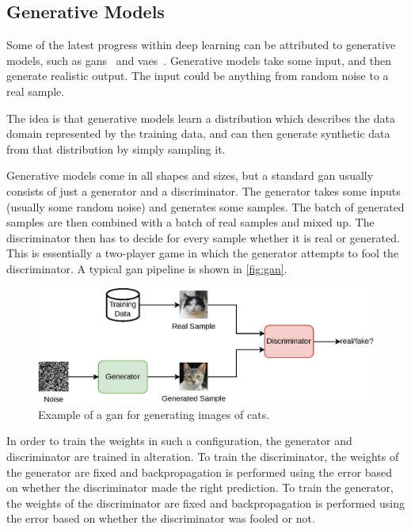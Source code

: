 \subsection{Generative Models}
Some of the latest progress within deep learning can be attributed to generative models, such as \glspl*{gan}~\cite{gan} and \glspl*{vae}~\cite{vae}. Generative models take some input, and then generate realistic output. The input could be anything from random noise to a real sample.
\par
The idea is that generative models learn a distribution which describes the data domain represented by the training data, and can then generate synthetic data from that distribution by simply sampling it.
\par
Generative models come in all shapes and sizes, but a standard \gls*{gan} usually consists of just a generator and a discriminator. The generator takes some inputs (usually some random noise) and generates some samples. The batch of generated samples are then combined with a batch of real samples and mixed up. The discriminator then has to decide for every sample whether it is real or generated. This is essentially a two-player game in which the generator attempts to fool the discriminator. A typical \gls*{gan} pipeline is shown in \autoref{fig:gan}.
\begin{figure}[htb]
    \centering
    \includegraphics[width=\linewidth]{resources/related_works/gan.eps}
    \caption[Gan Example]{Example of a \gls*{gan} for generating images of cats.}
    \label{fig:gan}
\end{figure}
\par
In order to train the weights in such a configuration, the generator and discriminator are trained in alteration. To train the discriminator, the weights of the generator are fixed and backpropagation is performed using the error based on whether the discriminator made the right prediction. To train the generator, the weights of the discriminator are fixed and backpropagation is performed using the error based on whether the discriminator was fooled or not.
